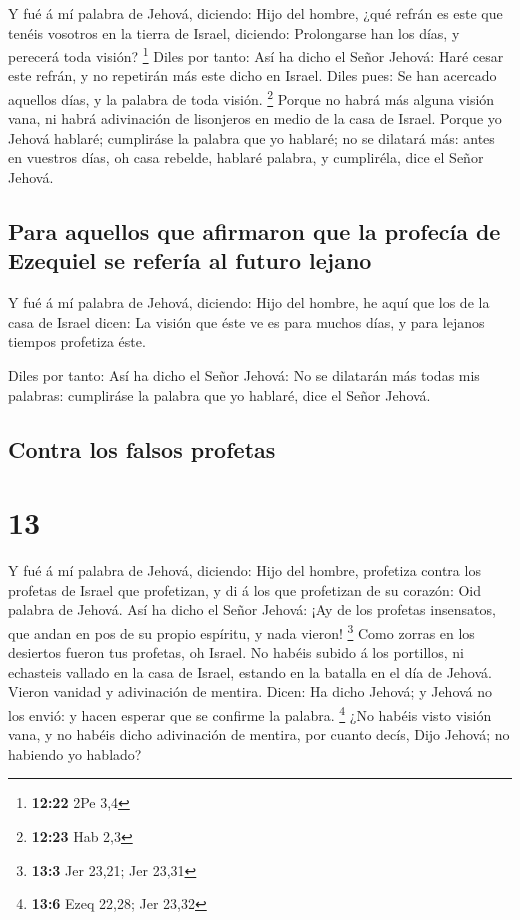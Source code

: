  Y fué á mí palabra de Jehová, diciendo: 
Hijo del hombre, ¿qué refrán es este que tenéis vosotros en la tierra de
Israel, diciendo: Prolongarse han los días, y perecerá toda visión?
\footnote{\textbf{12:22} 2Pe 3,4}  Diles por tanto: Así
ha dicho el Señor Jehová: Haré cesar este refrán, y no repetirán más
este dicho en Israel. Diles pues: Se han acercado aquellos días, y la
palabra de toda visión. \footnote{\textbf{12:23} Hab 2,3}
 Porque no habrá más alguna visión vana, ni habrá
adivinación de lisonjeros en medio de la casa de Israel. 
Porque yo Jehová hablaré; cumpliráse la palabra que yo hablaré; no se
dilatará más: antes en vuestros días, oh casa rebelde, hablaré palabra,
y cumpliréla, dice el Señor Jehová.

\hypertarget{para-aquellos-que-afirmaron-que-la-profecuxeda-de-ezequiel-se-referuxeda-al-futuro-lejano}{%
\subsection{Para aquellos que afirmaron que la profecía de Ezequiel se
refería al futuro
lejano}\label{para-aquellos-que-afirmaron-que-la-profecuxeda-de-ezequiel-se-referuxeda-al-futuro-lejano}}

 Y fué á mí palabra de Jehová, diciendo: 
Hijo del hombre, he aquí que los de la casa de Israel dicen: La visión
que éste ve es para muchos días, y para lejanos tiempos profetiza éste.

 Diles por tanto: Así ha dicho el Señor Jehová: No se
dilatarán más todas mis palabras: cumpliráse la palabra que yo hablaré,
dice el Señor Jehová.

\hypertarget{contra-los-falsos-profetas}{%
\subsection{Contra los falsos
profetas}\label{contra-los-falsos-profetas}}

\hypertarget{section-12}{%
\section{13}\label{section-12}}

 Y fué á mí palabra de Jehová, diciendo: 
Hijo del hombre, profetiza contra los profetas de Israel que profetizan,
y di á los que profetizan de su corazón: Oid palabra de Jehová.
 Así ha dicho el Señor Jehová: ¡Ay de los profetas
insensatos, que andan en pos de su propio espíritu, y nada vieron!
\footnote{\textbf{13:3} Jer 23,21; Jer 23,31}  Como zorras
en los desiertos fueron tus profetas, oh Israel.  No
habéis subido á los portillos, ni echasteis vallado en la casa de
Israel, estando en la batalla en el día de Jehová.  Vieron
vanidad y adivinación de mentira. Dicen: Ha dicho Jehová; y Jehová no
los envió: y hacen esperar que se confirme la palabra. \footnote{\textbf{13:6}
  Ezeq 22,28; Jer 23,32}  ¿No habéis visto visión vana, y
no habéis dicho adivinación de mentira, por cuanto decís, Dijo Jehová;
no habiendo yo hablado?

